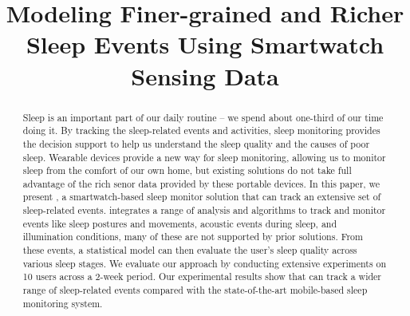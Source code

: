 \documentclass[conference]{sigchi}
\begin{document}
\title{Modeling Finer-grained and Richer Sleep Events Using Smartwatch Sensing Data}

\maketitle

\begin{abstract}

Sleep is an important part of our daily routine -- we spend about one-third of our time doing it. By tracking the
sleep-related events and activities, sleep monitoring provides the decision
support to help us understand the sleep quality and the causes of poor sleep. Wearable
devices provide a new way for sleep monitoring, allowing us to monitor sleep from
the comfort of our own home, but existing solutions do not take full advantage
of the rich senor data provided by these portable devices. In this paper, we present {\systemname}, a
smartwatch-based sleep monitor solution that can track an extensive set of
sleep-related events. \systemname integrates a range of analysis and algorithms
to track and monitor events like sleep postures and movements, acoustic events during sleep, and illumination conditions,
many of these are not supported by prior solutions. From these events, a statistical
model can then evaluate the user's sleep quality across various sleep stages.
We evaluate our approach by conducting extensive experiments on 10 users across
a 2-week period. Our experimental results show that \systemname can track a
wider range of sleep-related events compared with the state-of-the-art mobile-based
sleep monitoring system.
\end{abstract}
\end{document}
